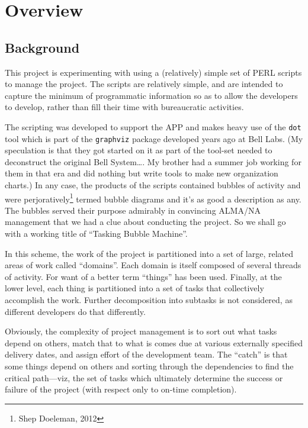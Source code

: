 %
%
\section{Overview}

\subsection{Background}

This project is experimenting with using a (relatively) simple set
of \ac{PERL} scripts to manage the project.  The scripts are relatively
simple, and are intended to capture the minimum of programmatic information
so as to allow the developers to develop, rather than fill their time with
bureaucratic activities.

The scripting was developed to support the \ac{APP} and makes
heavy use of the \texttt{dot} tool which is part of the \texttt{graphviz}
package developed years ago at Bell Labs.  (My speculation is that they
got started on it as part of the tool-set needed to deconstruct the original
Bell System\ldots.  My brother had a summer job working for them in that
era and did nothing but write tools to make new organization charts.)
In any case, the products of the scripts contained bubbles of activity and
were perjoratively\footnote{Shep Doeleman, 2012} termed bubble diagrams and
it's as good a description as any.  The bubbles served their purpose admirably
in convincing ALMA/NA management that we had a clue about conducting the
project.  So we shall go with a working title of ``Tasking Bubble Machine''.

In this scheme, the work of the project is partitioned into a set of large,
related areas of work called ``domains''.  Each domain is itself composed of
several threads of activity.  For want of a better term ``things'' has been
used.   Finally, at the lower level, each thing is partitioned into a set of
tasks that collectively accomplish the work.  Further decomposition into
subtasks is not considered, as different developers do that differently.

Obviously, the complexity of project management is to sort out what tasks
depend on others, match that to what is comes due at various externally
specified delivery dates, and assign effort of the development team.
The ``catch'' is that some things depend on others and sorting through
the dependencies to find the critical path---viz, the set of tasks which
ultimately determine the success or failure of the project (with respect
only to on-time completion).

